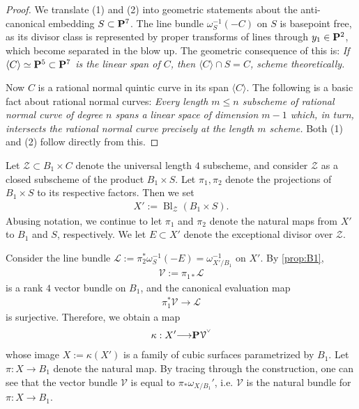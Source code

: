 \documentclass[12pt,reqno]{amsart}
\DeclareMathOperator{\Bl}{Bl}
\renewcommand{\to}{{\longrightarrow}}
\numberwithin{equation}{section}
\newcommand{\V}{\mathcal V}
\newcommand{\smvee}{\raise0.5ex\hbox{$\scriptscriptstyle\vee$}}
\begin{document}
\begin{proof}
  We translate (1) and (2) into geometric statements about the
  anti-canonical embedding $S \subset \P^{7}$.  The line bundle
  $\omega_{S}^{-1}(-C)$ on $S$ is basepoint free, as its divisor class
  is represented by proper transforms of lines through
  $y_{1} \in \P^2$, which become separated in the blow up.  The
  geometric consequence of this is: {\sl If
    $\langle C \rangle \simeq \P^5 \subset \P^7$ is the linear span of
    $C$, then $\langle C \rangle \cap S = C$, scheme theoretically.}

  Now $C$ is a rational normal quintic curve in its span
  $\langle C \rangle$. The following is a basic fact about rational
  normal curves: {\sl Every length $m \leq n$ subscheme of rational
    normal curve of degree $n$ spans a linear space of dimension $m-1$
    which, in turn, intersects the rational normal curve precisely at
    the length $m$ scheme.}  Both (1) and (2) follow directly from
  this.
\end{proof}

Let $\mathcal{Z} \subset B_1 \times C$ denote the universal
length $4$ subscheme, and consider $\mathcal{Z}$ as a closed subscheme
of the product $B_1 \times S$. Let $\pi_{1}, \pi_{2}$ denote the
projections of $B_1 \times S$ to its respective factors.
Then we set
\begin{align}
  \label{eq:X1}
  X' := \Bl_{\mathcal{Z}} \left( B_1 \times S \right).
\end{align}
Abusing notation, we continue to let $\pi_{1}$ and $\pi_{2}$ denote
the natural maps from $X'$ to $B_1$ and $S$, respectively.  We
let $E \subset X'$ denote the exceptional divisor over $\mathcal{Z}$.


Consider the line bundle
$\mathcal{L} := \pi_{2}^{*}\omega_{S}^{-1} (-E) =
\omega_{X'/B_{1}}^{-1}$ on $X'$.  By \autoref{prop:B1},
\begin{align}
  \label{eq:V1}
  \V := \pi_{1 *}\mathcal{L}
\end{align}
is a rank $4$ vector bundle on $B_1$, and the canonical evaluation map
\begin{align}
  \label{eq:eval1}
  \pi_{1}^{*}\V \to \mathcal{L}
\end{align}
is surjective.  Therefore, we obtain a map
\begin{align}
  \label{eq:X11}
  \kappa: X' \to \P \V^{\smvee}
\end{align}
whose image $X := \kappa(X')$ is a family of cubic surfaces
parametrized by $B_1$.  Let $\pi: X \to B_1$ denote the natural map.
By tracing through the construction, one can see that the vector
bundle $\V$ is equal to $\pi_{*} \omega_{X/B_1}'$, i.e. $\V$ is the
natural bundle for $\pi: X \to B_1$.
\end{document}
